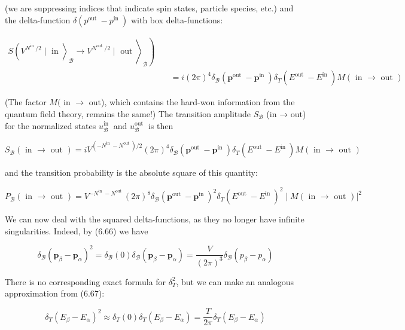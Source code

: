 \documentclass[10pt, letterpaper]{article}
\begin{document}
(we are suppressing indices that indicate spin states, particle species, etc.) and the delta-function $\delta\left(p^{\text {out }}-p^{\text {in }}\right)$ with box delta-functions:

$$
\begin{aligned}
\left.\left.S\left(V^{N^{\text {in }} / 2} \mid \text { in }\right\rangle_{\mathcal{B}} \rightarrow V^{N^{\text {out }} / 2} \mid \text { out }\right\rangle_{\mathcal{B}}\right) & \\
& \quad=i(2 \pi)^{4} \delta_{\mathcal{B}}\left(\mathbf{p}^{\text {out }}-\mathbf{p}^{\text {in }}\right) \delta_{T}\left(E^{\text {out }}-E^{\text {in }}\right) M(\text { in } \rightarrow \text { out })
\end{aligned}
$$

(The factor $M($ in $\rightarrow$ out), which contains the hard-won information from the quantum field theory, remains the same!) The transition amplitude $S_{\mathcal{B}}$ (in → out) for the normalized states $u_{\mathcal{B}}^{\text {in }}$ and $u_{\mathcal{B}}^{\text {out }}$ is then

$$
S_{\mathcal{B}}(\text { in } \rightarrow \text { out })=i V^{\left(-N^{\text {in }}-N^{\text {out }}\right) / 2}(2 \pi)^{4} \delta_{\mathcal{B}}\left(\mathbf{p}^{\text {out }}-\mathbf{p}^{\text {in }}\right) \delta_{T}\left(E^{\text {out }}-E^{\text {in }}\right) M(\text { in } \rightarrow \text { out })
$$

and the transition probability is the absolute square of this quantity:

$$
P_{\mathcal{B}}(\text { in } \rightarrow \text { out })=V^{-N^{\text {in }}-N^{\text {out }}}(2 \pi)^{8} \delta_{\mathcal{B}}\left(\mathbf{p}^{\text {out }}-\mathbf{p}^{\text {in }}\right)^{2} \delta_{T}\left(E^{\text {out }}-E^{\text {in }}\right)^{2} \mid\left. M(\text { in } \rightarrow \text { out })\right|^{2}
$$

We can now deal with the squared delta-functions, as they no longer have infinite singularities. Indeed, by (6.66) we have

$$
\delta_{\mathcal{B}}\left(\mathbf{p}_{\beta}-\mathbf{p}_{\alpha}\right)^{2}=\delta_{\mathcal{B}}(0) \delta_{\mathcal{B}}\left(\mathbf{p}_{\beta}-\mathbf{p}_{\alpha}\right)=\frac{V}{(2 \pi)^{3}} \delta_{\mathcal{B}}\left(p_{\beta}-p_{\alpha}\right)
$$

There is no corresponding exact formula for $\delta_{T}^{2}$, but we can make an analogous approximation from (6.67):

$$
\delta_{T}\left(E_{\beta}-E_{\alpha}\right)^{2} \approx \delta_{T}(0) \delta_{T}\left(E_{\beta}-E_{\alpha}\right)=\frac{T}{2 \pi} \delta_{T}\left(E_{\beta}-E_{\alpha}\right)
$$
\end{document}
